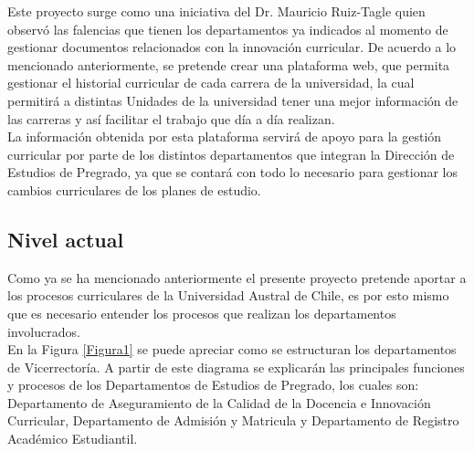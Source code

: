 \documentclass[12pt]{article}
\begin{document}
		Este proyecto surge como una iniciativa del Dr. Mauricio Ruiz-Tagle quien observó las falencias que tienen los 
		departamentos ya indicados al momento de gestionar documentos relacionados con la innovación curricular.  
		De acuerdo a lo mencionado anteriormente, se pretende crear una plataforma web, que permita gestionar el historial 
		curricular de cada carrera de la universidad, la cual permitirá a distintas Unidades de la universidad tener una 
		mejor información  de las carreras y así facilitar el trabajo que día a día realizan.
		\\
		
		La información obtenida por esta plataforma servirá de apoyo para la gestión curricular por parte de los distintos departamentos que integran la Dirección de Estudios de Pregrado, ya que se contará con todo lo necesario para gestionar los cambios curriculares de los planes de estudio.
		
		
		
	
		

     	 \newpage
     	 
     	 
    

		\subsection{Nivel actual}
		
		Como ya se ha mencionado anteriormente el presente proyecto pretende aportar a los procesos curriculares de la Universidad Austral de Chile, es por esto mismo que es necesario entender los procesos que realizan los departamentos involucrados.
		\\
		
		En la Figura \ref{Figura1} se puede apreciar como se estructuran los departamentos de Vicerrectoría. A partir de este diagrama se explicarán las principales funciones y procesos de los Departamentos de Estudios de Pregrado, los cuales son: Departamento de Aseguramiento de la Calidad de la Docencia e Innovación Curricular, Departamento de Admisión y Matricula y Departamento de Registro Académico Estudiantil.
		
\end{document}
